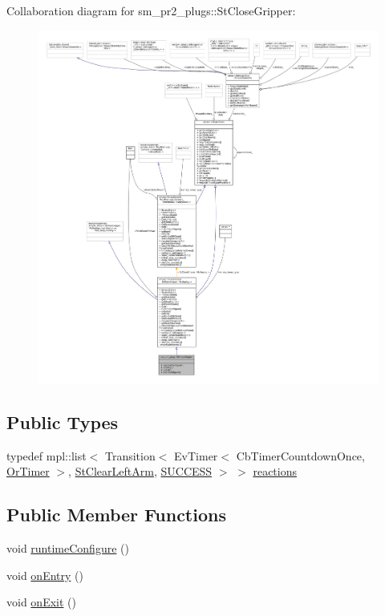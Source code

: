 Collaboration diagram for sm\+\_\+pr2\+\_\+plugs\+:\+:St\+Close\+Gripper\+:
\nopagebreak
\begin{figure}[H]
\begin{center}
\leavevmode
\includegraphics[width=350pt]{structsm__pr2__plugs_1_1StCloseGripper__coll__graph}
\end{center}
\end{figure}
\subsection*{Public Types}
\begin{DoxyCompactItemize}
\item 
typedef mpl\+::list$<$ Transition$<$ Ev\+Timer$<$ Cb\+Timer\+Countdown\+Once, \hyperlink{classsm__pr2__plugs_1_1OrTimer}{Or\+Timer} $>$, \hyperlink{structsm__pr2__plugs_1_1StClearLeftArm}{St\+Clear\+Left\+Arm}, \hyperlink{classSUCCESS}{S\+U\+C\+C\+E\+SS} $>$ $>$ \hyperlink{structsm__pr2__plugs_1_1StCloseGripper_a0ad3f271dea7b36dc6ac599b9818bb77}{reactions}
\end{DoxyCompactItemize}
\subsection*{Public Member Functions}
\begin{DoxyCompactItemize}
\item 
void \hyperlink{structsm__pr2__plugs_1_1StCloseGripper_aaad13a14b27b9e31bd14aa932c191d57}{runtime\+Configure} ()
\item 
void \hyperlink{structsm__pr2__plugs_1_1StCloseGripper_ab02f295cf4e96a2e2df9253f9d9eb0ae}{on\+Entry} ()
\item 
void \hyperlink{structsm__pr2__plugs_1_1StCloseGripper_ab0972fc5de8419ff5ae8cde2e8b8e8ba}{on\+Exit} ()
\end{DoxyCompactItemize}
